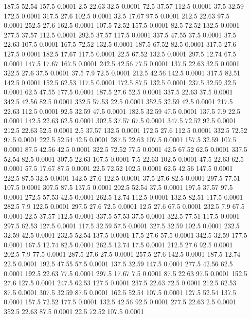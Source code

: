 187.5	52.54	157.5	0.0001
2.5	22.63	32.5	0.0001
72.5	37.57	112.5	0.0001
37.5	32.59	172.5	0.0001
317.5	27.6	102.5	0.0001
32.5	17.67	97.5	0.0001
212.5	22.63	97.5	0.0001
252.5	27.6	162.5	0.0001
107.5	72.52	157.5	0.0001
82.5	72.52	132.5	0.0001
277.5	37.57	112.5	0.0001
292.5	37.57	117.5	0.0001
337.5	47.55	37.5	0.0001
37.5	22.63	107.5	0.0001
167.5	72.52	132.5	0.0001
187.5	67.52	82.5	0.0001
317.5	27.6	127.5	0.0001
182.5	17.67	117.5	0.0001
22.5	67.52	132.5	0.0001
297.5	12.74	67.5	0.0001
147.5	17.67	167.5	0.0001
242.5	42.56	77.5	0.0001
137.5	22.63	32.5	0.0001
322.5	27.6	37.5	0.0001
37.5	7.9	72.5	0.0001
212.5	42.56	142.5	0.0001
317.5	82.51	142.5	0.0001
152.5	62.53	117.5	0.0001
172.5	87.5	132.5	0.0001
237.5	32.59	32.5	0.0001
62.5	47.55	177.5	0.0001
187.5	27.6	52.5	0.0001
337.5	22.63	37.5	0.0001
342.5	42.56	82.5	0.0001
332.5	57.53	22.5	0.0001
352.5	32.59	42.5	0.0001
217.5	22.63	112.5	0.0001
92.5	32.59	47.5	0.0001
182.5	32.59	47.5	0.0001
137.5	7.9	22.5	0.0001
142.5	22.63	62.5	0.0001
302.5	37.57	67.5	0.0001
347.5	72.52	92.5	0.0001
212.5	22.63	52.5	0.0001
2.5	37.57	132.5	0.0001
172.5	27.6	112.5	0.0001
332.5	72.52	97.5	0.0001
222.5	52.54	42.5	0.0001
287.5	22.63	107.5	0.0001
157.5	32.59	107.5	0.0001
87.5	42.56	42.5	0.0001
322.5	72.52	77.5	0.0001
42.5	67.52	62.5	0.0001
337.5	52.54	82.5	0.0001
307.5	22.63	107.5	0.0001
7.5	22.63	102.5	0.0001
47.5	22.63	62.5	0.0001
57.5	17.67	87.5	0.0001
22.5	72.52	102.5	0.0001
62.5	42.56	147.5	0.0001
222.5	87.5	32.5	0.0001
142.5	27.6	122.5	0.0001
37.5	27.6	82.5	0.0001
297.5	77.51	107.5	0.0001
307.5	87.5	137.5	0.0001
202.5	52.54	37.5	0.0001
197.5	37.57	97.5	0.0001
272.5	57.53	42.5	0.0001
262.5	12.74	112.5	0.0001
132.5	82.51	117.5	0.0001
282.5	7.9	122.5	0.0001
297.5	27.6	72.5	0.0001
12.5	27.6	67.5	0.0001
232.5	7.9	67.5	0.0001
22.5	37.57	112.5	0.0001
337.5	57.53	37.5	0.0001
322.5	77.51	117.5	0.0001
297.5	62.53	127.5	0.0001
117.5	32.59	57.5	0.0001
327.5	32.59	102.5	0.0001
232.5	32.59	42.5	0.0001
232.5	52.54	137.5	0.0001
17.5	27.6	57.5	0.0001
342.5	32.59	177.5	0.0001
167.5	12.74	82.5	0.0001
262.5	12.74	17.5	0.0001
212.5	27.6	92.5	0.0001
202.5	7.9	77.5	0.0001
287.5	27.6	27.5	0.0001
257.5	27.6	142.5	0.0001
187.5	12.74	22.5	0.0001
192.5	47.55	57.5	0.0001
137.5	32.59	147.5	0.0001
277.5	42.56	62.5	0.0001
192.5	22.63	77.5	0.0001
297.5	17.67	7.5	0.0001
87.5	22.63	97.5	0.0001
152.5	27.6	127.5	0.0001
247.5	62.53	127.5	0.0001
237.5	22.63	72.5	0.0001
212.5	62.53	87.5	0.0001
307.5	32.59	87.5	0.0001
162.5	52.54	107.5	0.0001
127.5	52.54	137.5	0.0001
157.5	72.52	177.5	0.0001
132.5	42.56	92.5	0.0001
277.5	22.63	2.5	0.0001
352.5	22.63	87.5	0.0001
22.5	72.52	107.5	0.0001
